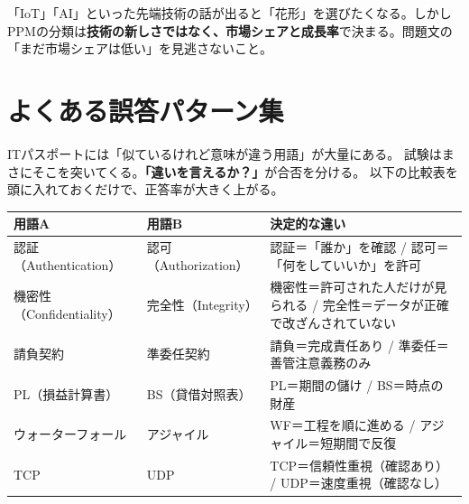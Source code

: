 \begin{trickwarn}
「IoT」「AI」といった先端技術の話が出ると「花形」を選びたくなる。しかしPPMの分類は\textbf{技術の新しさではなく、市場シェアと成長率}で決まる。問題文の「まだ市場シェアは低い」を見逃さないこと。
\end{trickwarn}



\section{よくある誤答パターン集}

\mondaipage
{}

\begin{stumble}
ITパスポートには「似ているけれど意味が違う用語」が大量にある。
試験はまさにそこを突いてくる。\textbf{「違いを言えるか？」}が合否を分ける。
以下の比較表を頭に入れておくだけで、正答率が大きく上がる。
\end{stumble}

\begin{comparison}
\begin{tabularx}{\textwidth}{lXX}
  \toprule
  \textbf{用語A} & \textbf{用語B} & \textbf{決定的な違い} \\
  \midrule
  認証（Authentication） & 認可（Authorization） & 認証＝「誰か」を確認 / 認可＝「何をしていいか」を許可 \\
  機密性（Confidentiality） & 完全性（Integrity） & 機密性＝許可された人だけが見られる / 完全性＝データが正確で改ざんされていない \\
  請負契約 & 準委任契約 & 請負＝完成責任あり / 準委任＝善管注意義務のみ \\
  PL（損益計算書） & BS（貸借対照表） & PL＝期間の儲け / BS＝時点の財産 \\
  ウォーターフォール & アジャイル & WF＝工程を順に進める / アジャイル＝短期間で反復 \\
  TCP & UDP & TCP＝信頼性重視（確認あり） / UDP＝速度重視（確認なし） \\
  \bottomrule
\end{tabularx}
\end{comparison}

